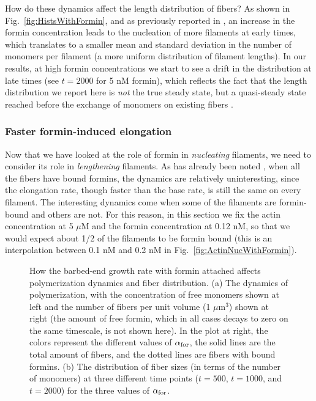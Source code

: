\documentclass[11pt]{article}
\begin{document}
How do these dynamics affect the length distribution of fibers? As shown in Fig.\ \ref{fig:HistsWithFormin}, and as previously reported in \cite{banerjee2022emergence}, an increase in the formin concentration leads to the nucleation of more filaments at early times, which translates to a smaller mean and standard deviation in the number of monomers per filament (a more uniform distribution of filament lengths). In our results, at high formin concentrations we start to see a drift in the distribution at late times (see $t=2000$ for 5 nM formin), which reflects the fact that the length distribution we report here is \emph{not} the true steady state, but a quasi-steady state reached before the exchange of monomers on existing fibers \cite{mohapatra2017limiting}.

\subsubsection{Faster formin-induced elongation}
Now that we have looked at the role of formin in \emph{nucleating} filaments, we need to consider its role in \emph{lengthening} filaments. As has already been noted \cite{banerjee2022emergence}, when all the fibers have bound formins, the dynamics are relatively uninteresting, since the elongation rate, though faster than the base rate, is still the same on every filament. The interesting dynamics come when some of the filaments are formin-bound and others are not. For this reason, in this section we fix the actin concentration at 5 $\mu$M and the formin concentration at 0.12 nM, so that we would expect about 1/2 of the filaments to be formin bound (this is an interpolation between 0.1 nM and 0.2 nM in Fig.\ \ref{fig:ActinNucWithFormin}). 

\begin{figure}
\centering
{}
\caption{\label{fig:ForminAlpha}How the barbed-end growth rate with formin attached affects polymerization dynamics and fiber distribution. (a) The dynamics of polymerization, with the concentration of free monomers shown at left and the number of fibers per unit volume (1 $\mu$m$^3$) shown at right (the amount of free formin, which in all cases decays to zero on the same timescale, is not shown here). In the plot at right, the colors represent the different values of $\alpha_\text{for}$, the solid lines are the total amount of fibers, and the dotted lines are fibers with bound formins. (b) The distribution of fiber sizes (in terms of the number of monomers) at three different time points ($t=500$, $t=1000$, and $t=2000$) for the three values of $\alpha_\text{for}$.}
\end{figure}
\end{document}
